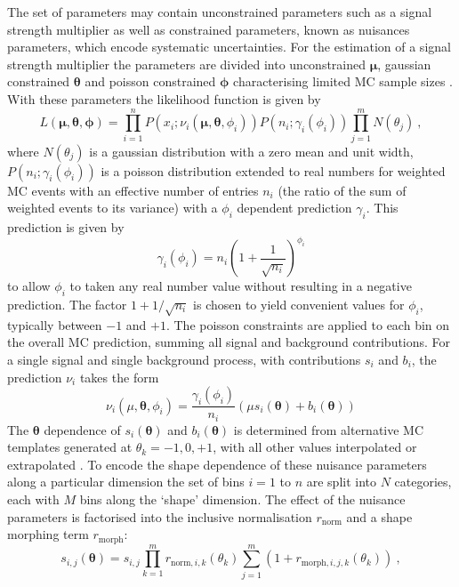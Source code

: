The set of parameters may contain unconstrained parameters such as a signal strength multiplier as well as constrained parameters, known as nuisances parameters, which encode systematic uncertainties. For the estimation of a signal strength multiplier the parameters are divided into unconstrained $\bm{\mu}$, gaussian constrained $\bm{\theta}$ and poisson constrained $\bm{\phi}$ characterising limited MC sample sizes \cite{Barlow:1993dm}. With these parameters the likelihood function is given by
%
\begin{equation}
    L(\bm{\mu},\bm{\theta},\bm{\phi}) = \prod_{i=1}^{n}P(x_i;\nu_i(\bm{\mu},\bm{\theta},\phi_i))P(n_i;\gamma_i(\phi_i))\prod_{j=1}^{m}N(\theta_j)\ ,
\end{equation}
%
where $N(\theta_j)$ is a gaussian distribution with a zero mean and unit width, $P(n_i;\gamma_i(\phi_i))$ is a poisson distribution extended to real numbers for weighted MC events with an effective number of entries $n_i$ (the ratio of the sum of weighted events to its variance) with a $\phi_i$ dependent prediction $\gamma_i$. This prediction is given by
%
\begin{equation}\label{eq:gammai}
    \gamma_i(\phi_i) = n_i\left(1 + \frac{1}{\sqrt{n_i}}\right)^{\phi_i}
\end{equation}
%
to allow $\phi_i$ to taken any real number value without resulting in a negative prediction. The factor $1 + 1/\sqrt{n_i}$ is chosen to yield convenient values for $\phi_i$, typically between $-1$ and $+1$. The poisson constraints are applied to each bin on the overall MC prediction, summing all signal and background contributions. For a single signal and single background process, with contributions $s_i$ and $b_i$, the prediction $\nu_i$ takes the form
%
\begin{equation}
    \nu_i(\mu,\bm{\theta},\phi_i) = \frac{\gamma_i(\phi_i)}{n_i}\left(\mu s_i(\bm{\theta}) + b_i(\bm{\theta})\right)
\end{equation}
%
The $\bm{\theta}$ dependence of $s_i(\bm{\theta})$ and $b_i(\bm{\theta})$ is determined from alternative MC templates generated at $\theta_k=-1,0,+1$, with all other values interpolated or extrapolated \cite{Conway:2011in}. To encode the shape dependence of these nuisance parameters along a particular dimension the set of bins $i=1$ to $n$ are split into $N$ categories, each with $M$ bins along the `shape' dimension. The effect of the nuisance parameters is factorised into the inclusive normalisation $r_{\mathrm{norm}}$ and a shape morphing term $r_{\mathrm{morph}}$:
\begin{equation}
    s_{i,j}(\bm{\theta}) = s_{i,j}\prod_{k=1}^{m}r_{\mathrm{norm},i,k}(\theta_k)\sum_{j=1}^{m}(1+r_{\mathrm{morph},i,j,k}(\theta_k))\ ,
\end{equation}
